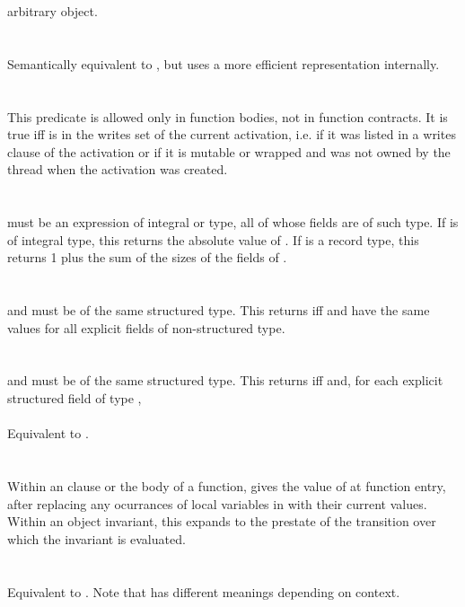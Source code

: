 \documentclass[preprint,nocopyrightspace]{sigplanconf}
\begin{document}
{{{{\begin{VCC}
arbitrary object.
\\\\
\\
Semantically equivalent to , but
uses a more efficient representation internally.
\\\\
\\
This predicate is allowed only in function bodies, not in function
contracts. It is true iff  is in the writes set of the current
activation, i.e. if it was listed in a writes clause of the activation
or if it is mutable or wrapped and was not owned by the thread when
the activation was created.
\\\\
\\
 must be an expression of integral or 
type, all of whose fields are of such type. If  is of integral
type, this returns the absolute value of . If  is a
record type, this returns 1 plus the sum of the sizes of the fields
of . 
\\\\
\\
 and  must be of the same structured type.
This returns \vcc{\true} iff  and  have the same
values for all explicit fields of non-structured type.
\\\\
\\
 and  must be of the same structured type. 
This returns \vcc{\true} iff  and, for each explicit
structured field  of type , 
\\\\
Equivalent to .
\\\\
\\
Within an \vcc{\ensures} clause or the body of a
function,  gives the
value of  at function entry, after replacing any ocurrances of
local variables in  with their current values.
Within an object invariant, this expands to the prestate of the
transition over which the invariant is evaluated. 
\\
\\
\\
Equivalent to . Note that \vcc{\old} has
different meanings depending on context.\\


\end{VCC}}}}}
\end{document}

